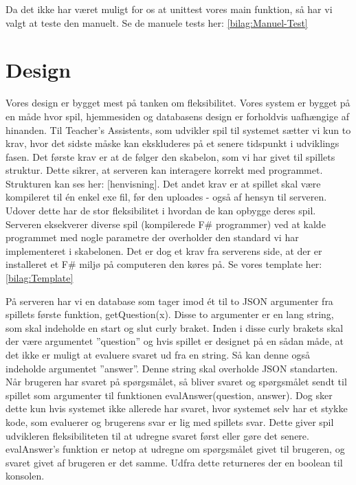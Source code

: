 \documentclass[12pt, a4paper]{article}
\begin{document}
Da det ikke har været muligt for os at unittest vores main funktion, så har vi valgt at teste den manuelt. Se de manuele tests her: \ref{bilag:Manuel-Test}

\section{Design}

Vores design er bygget mest på tanken om fleksibilitet. Vores system er bygget på en måde hvor spil, hjemmesiden og databasens design er forholdvis uafhængige af hinanden. Til Teacher's Assistents, som udvikler spil til systemet sætter vi kun to krav, hvor det sidste måske kan ekskluderes på et senere tidspunkt i udviklings fasen. Det første krav er at de følger den skabelon, som vi har givet til spillets struktur. Dette sikrer, at serveren kan interagere korrekt med programmet. Strukturen kan ses her: [henvisning]. Det andet krav er at spillet skal være kompileret til én enkel exe fil, før den uploades - også af hensyn til serveren. Udover dette har de stor fleksibilitet i hvordan de kan opbygge deres spil. \\

Serveren eksekverer diverse spil (kompilerede F\# programmer) ved at kalde programmet med nogle parametre der overholder den standard vi har implementeret i skabelonen. Det er dog et krav fra serverens side, at der er installeret et F\# miljø på computeren den køres på. Se vores template her: \ref{bilag:Template}

På serveren har vi en database som tager imod ét til to JSON argumenter fra spillets første funktion, getQuestion(x). Disse to argumenter er en lang string, som skal indeholde en start og slut curly braket. Inden i disse curly brakets skal der være argumentet ''question'' og hvis spillet er designet på en sådan måde, at det ikke er muligt at evaluere svaret ud fra en string. Så kan denne også indeholde argumentet ''answer''. Denne string skal overholde JSON standarten. \\

Når brugeren har svaret på spørgsmålet, så bliver svaret og spørgsmålet sendt til spillet som argumenter til funktionen evalAnswer(question, answer). Dog sker dette kun hvis systemet ikke allerede har svaret, hvor systemet selv har et stykke kode, som evaluerer og brugerens svar er lig med spillets svar. Dette giver spil udvikleren fleksibiliteten til at udregne svaret først eller gøre det senere. evalAnswer's funktion er netop at udregne om spørgsmålet givet til brugeren, og svaret givet af brugeren er det samme. Udfra dette returneres der en boolean til konsolen. \\
\end{document}
